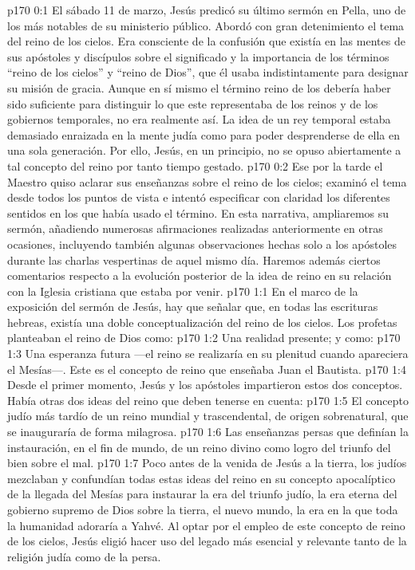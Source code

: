 \author{Comisión de seres intermedios}
\vs p170 0:1 El sábado 11 de marzo, Jesús predicó su último sermón en Pella, uno de los más notables de su ministerio público. Abordó con gran detenimiento el tema del reino de los cielos. Era consciente de la confusión que existía en las mentes de sus apóstoles y discípulos sobre el significado y la importancia de los términos “reino de los cielos” y “reino de Dios”, que él usaba indistintamente para designar su misión de gracia. Aunque en sí mismo el término reino de los  debería haber sido suficiente para distinguir lo que este representaba de los reinos  y de los gobiernos temporales, no era realmente así. La idea de un rey temporal estaba demasiado enraizada en la mente judía como para poder desprenderse de ella en una sola generación. Por ello, Jesús, en un principio, no se opuso abiertamente a tal concepto del reino por tanto tiempo gestado.
\vs p170 0:2 Ese  por la tarde el Maestro quiso aclarar sus enseñanzas sobre el reino de los cielos; examinó el tema desde todos los puntos de vista e intentó especificar con claridad los diferentes sentidos en los que había usado el término. En esta narrativa, ampliaremos su sermón, añadiendo numerosas afirmaciones realizadas anteriormente en otras ocasiones, incluyendo también algunas observaciones hechas solo a los apóstoles durante las charlas vespertinas de aquel mismo día. Haremos además ciertos comentarios respecto a la evolución posterior de la idea de reino en su relación con la Iglesia cristiana que estaba por venir.
\vs p170 1:1 En el marco de la exposición del sermón de Jesús, hay que señalar que, en todas las escrituras hebreas, existía una doble conceptualización del reino de los cielos. Los profetas planteaban el reino de Dios como:
\vs p170 1:2 Una realidad presente; y como:
\vs p170 1:3 Una esperanza futura ---el reino se realizaría en su plenitud cuando apareciera el Mesías---. Este es el concepto de reino que enseñaba Juan el Bautista.
\vs p170 1:4 Desde el primer momento, Jesús y los apóstoles impartieron estos dos conceptos. Había otras dos ideas del reino que deben tenerse en cuenta:
\vs p170 1:5 El concepto judío más tardío de un reino mundial y trascendental, de origen sobrenatural, que se inauguraría de forma milagrosa.
\vs p170 1:6 Las enseñanzas persas que definían la instauración, en el fin de mundo, de un reino divino como logro del triunfo del bien sobre el mal.
\vs p170 1:7 \pc Poco antes de la venida de Jesús a la tierra, los judíos mezclaban y confundían todas estas ideas del reino en su concepto apocalíptico de la llegada del Mesías para instaurar la era del triunfo judío, la era eterna del gobierno supremo de Dios sobre la tierra, el nuevo mundo, la era en la que toda la humanidad adoraría a Yahvé. Al optar por el empleo de este concepto de reino de los cielos, Jesús eligió hacer uso del legado más esencial y relevante tanto de la religión judía como de la persa.
